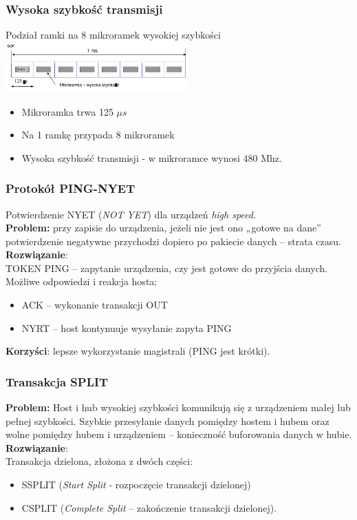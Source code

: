 	\subsubsection{Wysoka szybkość transmisji}
	Podział ramki na 8 mikroramek wysokiej szybkości\\
	\includegraphics[width=7cm]{./wyklady/USB_53_1.pdf}
	\begin{itemize}
		\item Mikroramka trwa 125 $\mu s$
		\item Na 1 ramkę przypada 8 mikroramek
		\item Wysoka szybkość transmisji - w mikroramce wynosi 480 Mhz.
	\end{itemize}
	\subsubsection{Protokół PING-NYET}
	Potwierdzenie NYET (\emph{NOT YET}) dla urządzeń \emph{high speed}.\\
	\textbf{Problem:} przy zapisie do urządzenia, jeżeli nie jest ono „gotowe na dane” potwierdzenie negatywne przychodzi dopiero po pakiecie danych – strata czasu.\\
	\textbf{Rozwiązanie}:\\
	TOKEN PING – zapytanie urządzenia, czy jest gotowe do przyjścia danych.\\
	Możliwe odpowiedzi i reakcja hosta:
	\begin{itemize}
		\item ACK – wykonanie transakcji OUT
		\item NYRT – host kontynuuje wysyłanie zapyta PING
	\end{itemize}
	\textbf{Korzyści}: lepsze wykorzystanie magistrali (PING jest krótki).
	\subsubsection{Transakcja SPLIT}
	\textbf{Problem:} Host i hub wysokiej szybkości komunikują się z urządzeniem małej lub pełnej szybkości. Szybkie przesyłanie danych pomiędzy hostem i hubem oraz wolne pomiędzy hubem i urządzeniem – konieczność buforowania danych w hubie.\\
	\textbf{Rozwiązanie}:\\
	Transakcja dzielona, złożona z dwóch części:
	\begin{itemize}
		\item SSPLIT (\emph{Start Split} - rozpoczęcie transakcji dzielonej)
		\item CSPLIT (\emph{Complete Split} – zakończenie transakcji dzielonej).
	\end{itemize}
